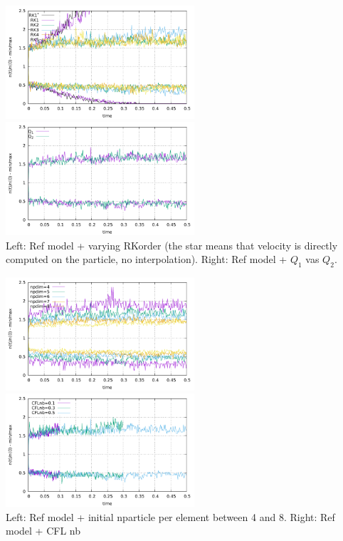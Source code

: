 \begin{center}
\includegraphics[width=7cm]{python_codes/fieldstone_30/results_streamline/markercount_rk12345}
\includegraphics[width=7cm]{python_codes/fieldstone_30/results_streamline/markercount_q12}\\
{\captionfont Left: Ref model + varying RKorder (the star means that velocity 
is directly computed on the particle, no interpolation). Right: Ref model + $Q_1$ vas $Q_2$. }
\end{center}

\begin{center}
\includegraphics[width=7cm]{python_codes/fieldstone_30/results_streamline/markercount_npd}
\includegraphics[width=7cm]{python_codes/fieldstone_30/results_streamline/markercount_cflnb}\\
{\captionfont Left: Ref model + initial nparticle per element between 4 and 8. Right: Ref model + CFL nb}
\end{center}

